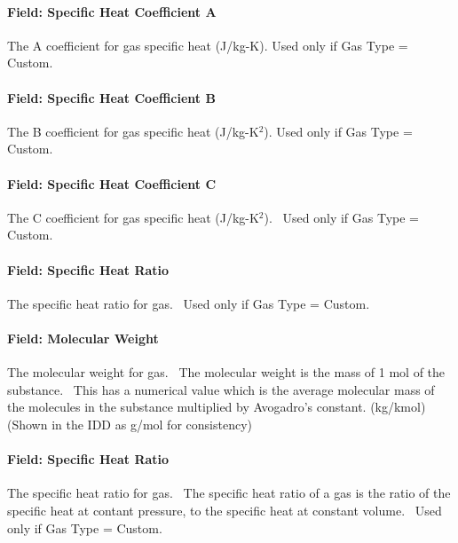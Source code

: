 \paragraph{Field: Specific Heat Coefficient A}\label{field-specific-heat-coefficient-a-1}

The A coefficient for gas specific heat (J/kg-K). Used only if Gas Type = Custom.

\paragraph{Field: Specific Heat Coefficient B}\label{field-specific-heat-coefficient-b-1}

The B coefficient for gas specific heat (J/kg-K\(^{2}\)). Used only if Gas Type = Custom.

\paragraph{Field: Specific Heat Coefficient C}\label{field-specific-heat-coefficient-c-1}

The C coefficient for gas specific heat (J/kg-K\(^{2}\)).~ Used only if Gas Type = Custom.

\paragraph{Field: Specific Heat Ratio}\label{field-specific-heat-ratio-2}

The specific heat ratio for gas.~ Used only if Gas Type = Custom.

\paragraph{Field: Molecular Weight}\label{field-molecular-weight-1}

The molecular weight for gas.~ The molecular weight is the mass of 1 mol of the substance.~ This has a numerical value which is the average molecular mass of the molecules in the substance multiplied by Avogadro's constant. (kg/kmol) (Shown in the IDD as g/mol for consistency)

\paragraph{Field: Specific Heat Ratio}\label{field-specific-heat-ratio-3}

The specific heat ratio for gas.~ The specific heat ratio of a gas is the ratio of the specific heat at contant pressure, to the specific heat at constant volume.~ Used only if Gas Type = Custom.

